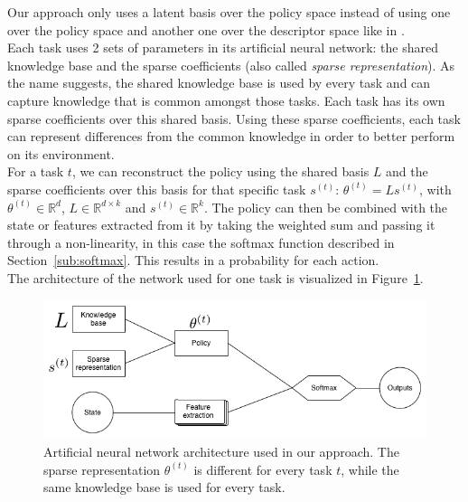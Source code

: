 Our approach only uses a latent basis over the policy space instead of using one over the policy space and another one over the descriptor space like in \cite{Isele2016UsingLearning}.\\
Each task uses 2 sets of parameters in its artificial neural network: the shared knowledge base and the sparse coefficients (also called \emph{sparse representation}). As the name suggests, the shared knowledge base is used by every task and can capture knowledge that is common amongst those tasks. Each task has its own sparse coefficients over this shared basis. Using these sparse coefficients, each task can represent differences from the common knowledge in order to better perform on its environment.\\
For a task $t$, we can reconstruct the policy using the shared basis $L$ and the sparse coefficients over this basis for that specific task $s^{(t)}$: $\theta^{(t)} = Ls^{(t)}$, with $\theta^{(t)} \in \mathbb{R}^d$, $L \in \mathbb{R}^{d \times k}$ and $s^{(t)} \in \mathbb{R}^k$. The policy can then be combined with the state or features extracted from it by taking the weighted sum and passing it through a non-linearity, in this case the softmax function described in Section~\ref{sub:softmax}.
This results in a probability for each action.\\
The architecture of the network used for one task is visualized in Figure~\ref{fig:algonn}.
\begin{figure}[htb]
    \centering
    \includegraphics[width=.9\linewidth]{images/knowledge_transfer.png}
    \caption[Artificial neural network architecture used in our approach]{Artificial neural network architecture used in our approach. The sparse representation $\theta^{(t)}$ is different for every task $t$, while the same knowledge base is used for every task.}
    \label{fig:algonn}
\end{figure}\\

